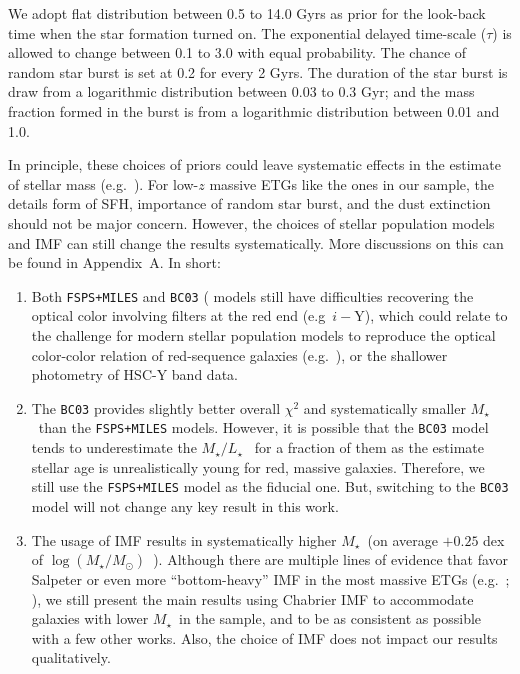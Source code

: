 \documentclass[preprint]{aastex}
\def\logms{{$\log (M_{\star}/M_{\odot})$}~}
\def\mstar{{$M_{\star}$}~}
\def\m2l{{$M_{\star}/L_{\star}$}~}
\begin{document}
\begin{CJK*}{UTF8}{gbsn}
    We adopt flat distribution between 0.5 to 14.0 Gyrs as prior for the look-back 
    time when the star formation turned on. 
    The exponential delayed time-scale ($\tau$) is allowed to change between 
    0.1 to 3.0 with equal probability.  
    The chance of random star burst is set at 0.2 for every 2 Gyrs. 
    The duration of the star burst is draw from a logarithmic distribution 
    between 0.03 to 0.3 Gyr; and the mass fraction formed in the burst is from 
    a logarithmic distribution between 0.01 and 1.0.  

    In principle, these choices of priors could leave systematic effects in 
    the estimate of stellar mass (e.g.\ \citealt{Bernardi2016b}). 
    For low-$z$ massive ETGs like the ones in our sample, the details form of 
    SFH, importance of random star burst, and the dust extinction should not be 
    major concern.  
    However, the choices of stellar population models and IMF can still 
    change the results systematically. 
    More discussions on this can be found in Appendix~A. 
    In short: 
    \begin{enumerate}
        \item Both \texttt{FSPS+MILES} and \texttt{BC03} (\citealt{BC03} models 
            still have difficulties recovering the optical color involving filters 
            at the red end (e.g~$i-$Y), which could relate to the challenge for 
            modern stellar population models to reproduce the optical color-color 
            relation of red-sequence galaxies (e.g.\ \citealt{MIUSCAT2}), or the 
            shallower photometry of HSC-Y band data. 
        \item The \texttt{BC03} provides slightly better overall ${\chi}^2$ and 
            systematically smaller \mstar than the \texttt{FSPS+MILES} models.  
            However, it is possible that the \texttt{BC03} model tends to 
            underestimate the \m2l for a fraction of them as the estimate 
            stellar age is unrealistically young for red, massive galaxies.  
            Therefore, we still use the \texttt{FSPS+MILES} model as the fiducial 
            one.  But, switching to the \texttt{BC03} model will not change any 
            key result in this work. 
        \item The usage of \citet{Salpeter1955} IMF results in systematically 
            higher \mstar (on average $+0.25$ dex of \logms).  
            Although there are multiple lines of evidence that favor Salpeter 
            or even more ``bottom-heavy'' IMF in the most massive ETGs 
            (e.g.\ \citealt{Conroy2012}; \citealt{Cappellari2012}), we still 
            present the main results using Chabrier IMF to accommodate galaxies 
            with lower \mstar in the sample, and to be as consistent as possible 
            with a few other works.  
            Also, the choice of IMF does not impact our results qualitatively.     
    \end{enumerate}
    

\end{CJK*}
\end{document}
